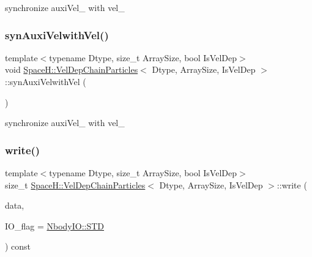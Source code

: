 synchronize auxi\+Vel\+\_\+ with vel\+\_\+ 

\mbox{\label{class_space_h_1_1_vel_dep_chain_particles_a0d32d36439671d1c2344178d1d548567}} 
\subsubsection{\texorpdfstring{syn\+Auxi\+Velwith\+Vel()}{synAuxiVelwithVel()}\hspace{0.1cm}{\footnotesize\ttfamily [2/2]}}
{\footnotesize\ttfamily template$<$typename Dtype, size\+\_\+t Array\+Size, bool Is\+Vel\+Dep$>$ \\
void \mbox{\hyperlink{class_space_h_1_1_vel_dep_chain_particles}{Space\+H\+::\+Vel\+Dep\+Chain\+Particles}}$<$ Dtype, Array\+Size, Is\+Vel\+Dep $>$\+::syn\+Auxi\+Velwith\+Vel (\begin{DoxyParamCaption}{ }\end{DoxyParamCaption})\hspace{0.3cm}{\ttfamily [inline]}}



synchronize auxi\+Vel\+\_\+ with vel\+\_\+ 

\mbox{\label{class_space_h_1_1_vel_dep_chain_particles_a469e7b3374c6a0067ebaa81a66d9b7d2}} 
\subsubsection{\texorpdfstring{write()}{write()}}
{\footnotesize\ttfamily template$<$typename Dtype, size\+\_\+t Array\+Size, bool Is\+Vel\+Dep$>$ \\
size\+\_\+t \mbox{\hyperlink{class_space_h_1_1_vel_dep_chain_particles}{Space\+H\+::\+Vel\+Dep\+Chain\+Particles}}$<$ Dtype, Array\+Size, Is\+Vel\+Dep $>$\+::write (\begin{DoxyParamCaption}\item[{\mbox{\hyperlink{class_space_h_1_1_vel_indep_particles_abca40159a816385790d5a6fd19c1dc6d}{Scalar\+Buffer}} \&}]{data,  }\item[{const \mbox{\hyperlink{namespace_space_h_a296a8bae763a754564bfdce216e31b59}{Nbody\+IO}}}]{I\+O\+\_\+flag = {\ttfamily \mbox{\hyperlink{namespace_space_h_a296a8bae763a754564bfdce216e31b59ac6ce23be5d350ce18a665427d2d950f7}{Nbody\+I\+O\+::\+S\+TD}}} }\end{DoxyParamCaption}) const\hspace{0.3cm}{\ttfamily [inline]}}



